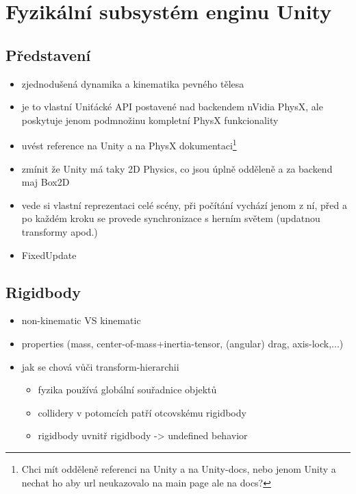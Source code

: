 \section{Fyzikální subsystém enginu Unity}

\subsection{Představení}
\begin{itemize}
    \item zjednodušená dynamika a kinematika pevného tělesa
    \item je to vlastní Uniťácké API postavené nad backendem nVidia PhysX, ale poskytuje jenom podmnožinu kompletní PhysX funkcionality
    \item uvést reference na Unity a na PhysX dokumentaci\footnote{Chci mít odděleně referenci na Unity a na Unity-docs, nebo jenom Unity a nechat ho aby url neukazovalo na main page ale na docs?}
    \item zmínit že Unity má taky 2D Physics, co jsou úplně odděleně a za backend maj Box2D 
    \item vede si vlastní reprezentaci celé scény, při počítání vychází jenom z ní, před a po každém kroku se provede synchronizace s herním světem (updatnou transformy apod.)
    \item FixedUpdate
\end{itemize}


\subsection{Rigidbody}
\begin{itemize}
    \item non-kinematic VS kinematic
    \item properties (mass, center-of-mass+inertia-tensor, (angular) drag, axis-lock,...)
    \item jak se chová vůči transform-hierarchii
          \begin{itemize}
            \item fyzika používá globální souřadnice objektů
            \item collidery v potomcích patří otcovskému rigidbody
            \item rigidbody uvnitř rigidbody -> undefined behavior
          \end{itemize}
\end{itemize}

